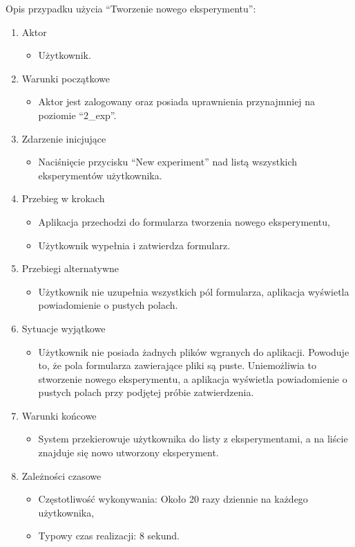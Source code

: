 Opis przypadku użycia \enquote{Tworzenie nowego eksperymentu}:
\begin{enumerate}
\item  Aktor
	\begin{itemize}
		\item Użytkownik. 
	\end{itemize}
\item Warunki początkowe
	\begin{itemize}
		\item Aktor jest zalogowany oraz posiada uprawnienia przynajmniej na poziomie \enquote{2\_exp}.
	\end{itemize}
\item Zdarzenie inicjujące
	\begin{itemize}
		\item Naciśnięcie przycisku \enquote{New experiment} nad listą wszystkich eksperymentów użytkownika.
	\end{itemize}
\item Przebieg w krokach
	\begin{itemize}
		\item Aplikacja przechodzi do formularza tworzenia nowego eksperymentu,
		\item Użytkownik wypełnia i zatwierdza formularz.
	\end{itemize}
\item Przebiegi alternatywne
	\begin{itemize}
		\item  Użytkownik nie uzupełnia wszystkich pól formularza, aplikacja wyświetla powiadomienie o pustych polach.
	\end{itemize}
\item Sytuacje wyjątkowe
	\begin{itemize}
		\item  Użytkownik nie posiada żadnych plików wgranych do aplikacji. Powoduje to, że pola formularza zawierające pliki są puste. Uniemożliwia to stworzenie nowego eksperymentu, a aplikacja wyświetla powiadomienie o pustych polach przy podjętej próbie zatwierdzenia.
	\end{itemize}
\item Warunki końcowe
	\begin{itemize}
		\item  System przekierowuje użytkownika do listy z eksperymentami, a na liście znajduje się nowo utworzony eksperyment.
	\end{itemize}
\item Zależności czasowe
	\begin{itemize}
		\item  Częstotliwość wykonywania: Około 20 razy dziennie na każdego użytkownika,
		\item Typowy czas realizacji: 8 sekund.
	\end{itemize}
\end{enumerate}
\vspace*{\baselineskip}

